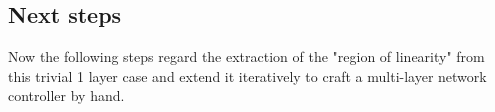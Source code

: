 \documentclass{article}
\begin{document}
\subsection*{Next steps}
Now the following steps regard the extraction of the "region of linearity" from this trivial 1 layer case and extend it iteratively to craft a multi-layer network controller by hand.

\pagebreak
\printbibliography
\end{document}

